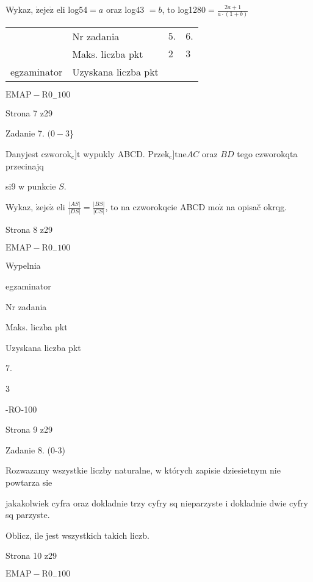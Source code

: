 \documentclass[a4paper,12pt]{article}
\begin{document}
Wykaz, $\dot{\mathrm{z}}\mathrm{e}\mathrm{j}\mathrm{e}\dot{\mathrm{z}}$ eli log54$=a$ oraz log43 $=b$, to log1280$=\displaystyle \frac{2a+1}{a\cdot(1+b)}$
\begin{center}
\begin{tabular}{|l|l|l|l|}
\cline{2-4}
&	\multicolumn{1}{|l|}{Nr zadania}&	\multicolumn{1}{|l|}{$5.$}&	\multicolumn{1}{|l|}{ $6.$}	\\
\cline{2-4}
&	\multicolumn{1}{|l|}{Maks. liczba pkt}&	\multicolumn{1}{|l|}{$2$}&	\multicolumn{1}{|l|}{ $3$}	\\
\cline{2-4}
\multicolumn{1}{|l|}{egzaminator}&	\multicolumn{1}{|l|}{Uzyskana liczba pkt}&	\multicolumn{1}{|l|}{}&	\multicolumn{1}{|l|}{}	\\
\hline
\end{tabular}

\end{center}
$\mathrm{E}\mathrm{M}\mathrm{A}\mathrm{P}-\mathrm{R}0_{-}100$

Strona 7 z29





Zadanie 7. $(0-3$\}

Danyjest $\mathrm{c}\mathrm{z}\mathrm{w}\mathrm{o}\mathrm{r}\mathrm{o}\mathrm{k}_{\mathrm{c}}$]$\mathrm{t}$ wypukly ABCD. $\mathrm{P}\mathrm{r}\mathrm{z}\mathrm{e}\mathrm{k}_{\mathrm{c}}$]$\mathrm{t}\mathrm{n}\mathrm{e} AC$ oraz $BD$ tego czworokqta przecinajq

si9 w punkcie $S.$

Wykaz, $\dot{\mathrm{z}}\mathrm{e}\mathrm{j}\mathrm{e}\dot{\mathrm{z}}$ eli $\displaystyle \frac{|AS|}{|DS|}=\frac{|BS|}{|CS|}$, to na czworokqcie ABCD $\mathrm{m}\mathrm{o}\dot{\mathrm{z}}$ na opisač okrqg.

Strona 8 z29

$\mathrm{E}\mathrm{M}\mathrm{A}\mathrm{P}-\mathrm{R}0_{-}100$





Wypelnia

egzaminator

Nr zadania

Maks. liczba pkt

Uzyskana liczba pkt

7.

3

-RO-100

Strona 9 z29





Zadanie 8. (0-3)

Rozwazamy wszystkie liczby naturalne, w których zapisie dziesietnym nie powtarza sie

jakakolwiek cyfra oraz dokladnie trzy cyfry sq nieparzyste i dokladnie dwie cyfry sq parzyste.

Oblicz, ile jest wszystkich takich liczb.

Strona 10 z29

$\mathrm{E}\mathrm{M}\mathrm{A}\mathrm{P}-\mathrm{R}0_{-}100$
\end{document}
